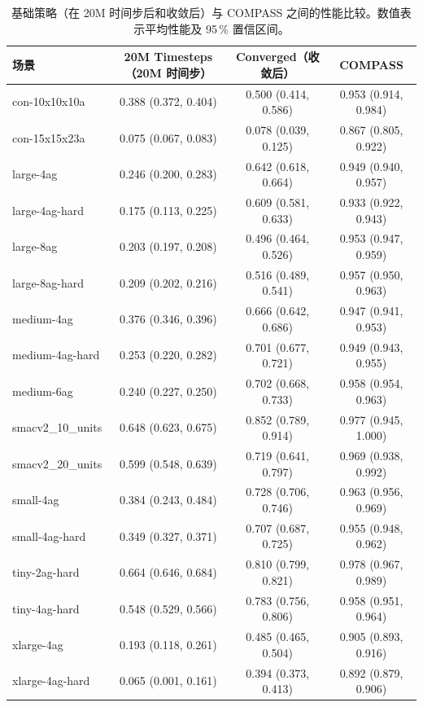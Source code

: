 \documentclass[11pt,UTF8,fontset=fandol]{ctexart}
\begin{document}
\begin{table}[H]\centering
\caption{基础策略（在 20M 时间步后和收敛后）与 COMPASS 之间的性能比较。数值表示平均性能及 95\,\% 置信区间。}
\label{tab:17}
\small
\begin{tabular}{lccc}
\toprule
场景 & 20M Timesteps（20M 时间步） & Converged（收敛后） & COMPASS\\
\midrule
con-10x10x10a & 0.388 (0.372, 0.404) & 0.500 (0.414, 0.586) & 0.953 (0.914, 0.984)\\
con-15x15x23a & 0.075 (0.067, 0.083) & 0.078 (0.039, 0.125) & 0.867 (0.805, 0.922)\\
large-4ag & 0.246 (0.200, 0.283) & 0.642 (0.618, 0.664) & 0.949 (0.940, 0.957)\\
large-4ag-hard & 0.175 (0.113, 0.225) & 0.609 (0.581, 0.633) & 0.933 (0.922, 0.943)\\
large-8ag & 0.203 (0.197, 0.208) & 0.496 (0.464, 0.526) & 0.953 (0.947, 0.959)\\
large-8ag-hard & 0.209 (0.202, 0.216) & 0.516 (0.489, 0.541) & 0.957 (0.950, 0.963)\\
medium-4ag & 0.376 (0.346, 0.396) & 0.666 (0.642, 0.686) & 0.947 (0.941, 0.953)\\
medium-4ag-hard & 0.253 (0.220, 0.282) & 0.701 (0.677, 0.721) & 0.949 (0.943, 0.955)\\
medium-6ag & 0.240 (0.227, 0.250) & 0.702 (0.668, 0.733) & 0.958 (0.954, 0.963)\\
smacv2\_10\_units & 0.648 (0.623, 0.675) & 0.852 (0.789, 0.914) & 0.977 (0.945, 1.000)\\
smacv2\_20\_units & 0.599 (0.548, 0.639) & 0.719 (0.641, 0.797) & 0.969 (0.938, 0.992)\\
small-4ag & 0.384 (0.243, 0.484) & 0.728 (0.706, 0.746) & 0.963 (0.956, 0.969)\\
small-4ag-hard & 0.349 (0.327, 0.371) & 0.707 (0.687, 0.725) & 0.955 (0.948, 0.962)\\
tiny-2ag-hard & 0.664 (0.646, 0.684) & 0.810 (0.799, 0.821) & 0.978 (0.967, 0.989)\\
tiny-4ag-hard & 0.548 (0.529, 0.566) & 0.783 (0.756, 0.806) & 0.958 (0.951, 0.964)\\
xlarge-4ag & 0.193 (0.118, 0.261) & 0.485 (0.465, 0.504) & 0.905 (0.893, 0.916)\\
xlarge-4ag-hard & 0.065 (0.001, 0.161) & 0.394 (0.373, 0.413) & 0.892 (0.879, 0.906)\\
\bottomrule
\end{tabular}
\end{table}
\end{document}
